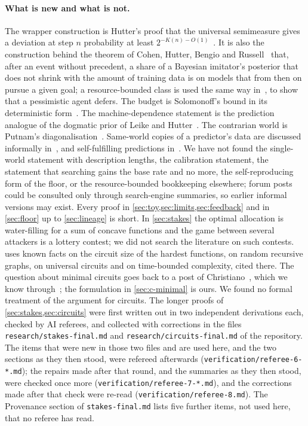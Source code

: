 \paragraph{What is new and what is not.} The wrapper construction is Hutter's proof that the universal
semimeasure gives a deviation at step $n$ probability at least $2^{-K(n)-O(1)}$~\cite[eq.~(17)]{hutter07}. It
is also the construction behind the theorem of Cohen, Hutter, Bengio and Russell~\cite{cohen25} that, after an
event without precedent, a share of a Bayesian imitator's posterior that does not shrink with the amount of
training data is on models that from then on pursue a given goal; a resource-bounded class is used the same
way in~\cite{cohen20}, to show that a pessimistic agent defers. The budget is Solomonoff's bound in its
deterministic form~\cite{solomonoff78,hutter07}. The machine-dependence statement is the prediction analogue
of the dogmatic prior of Leike and Hutter~\cite{leike15}. The contrarian world is Putnam's
diagonalisation~\cite{putnam63,legg06}. Same-world copies of a predictor's data are discussed informally
in~\cite[\S2.5]{hubinger23}, and self-fulfilling predictions in~\cite{armstrong17,oesterheld23,hubinger23}. We
have not found the single-world statement with description lengths, the calibration statement, the statement
that searching gains the base rate and no more, the self-reproducing form of the floor, or the
resource-bounded bookkeeping elsewhere; forum posts could be consulted only through search-engine summaries,
so earlier
informal versions may exist. Every proof in \cref{sec:toy,sec:limits,sec:feedback} and in \cref{sec:floor}
up to \cref{sec:lineage} is short. In \cref{sec:stakes} the optimal allocation is water-filling for a sum of
concave functions and the game between several attackers is a lottery contest; we did not search the
literature on such contests.  uses known facts on the circuit size of the hardest
functions, on random recursive graphs, on universal circuits and on time-bounded complexity, cited there.
The question about minimal circuits goes back to a post of
Christiano~\cite{christiano18}, which we know through~\cite{hubinger19}; the formulation in
\cref{sec:c-minimal} is ours. We found no formal treatment of the argument for circuits. The longer proofs of
\cref{sec:stakes,sec:circuits} were first written out in two independent derivations each, checked by AI
referees, and collected with corrections in the files \texttt{research/stakes-final.md} and
\texttt{research/circuits-final.md} of the repository. The items that were new in those two files and are
used here, and the two sections as they then stood, were refereed afterwards
(\texttt{verification/referee-6-*.md}); the repairs made after that round, and the summaries as they then
stood, were checked once more (\texttt{verification/referee-7-*.md}), and the corrections made after that
check were re-read (\texttt{verification/referee-8.md}). The Provenance section of \texttt{stakes-final.md}
lists
five further items, not used here, that no referee has read.


